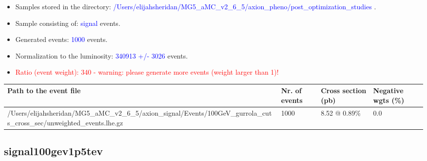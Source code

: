 \documentclass[a4paper, 10pt]{article}
\begin{document}
\begin{itemize}
  \item Samples stored in the directory: \textcolor{blue}{/\-Users/\-elijahsheridan/\-MG5\_aMC\_v2\_6\_5/\-axion\_pheno/\-post\_optimization\_studies} .
   \item Sample consisting of: \textcolor{blue}{signal}  events.
   \item Generated events: \textcolor{blue}{1000 }  events.
   \item Normalization to the luminosity: \textcolor{blue}{340913}\textcolor{blue}{ +/\-- }\textcolor{blue}{3026 }  events.
   \item\textcolor{red}{Ratio (event weight): }\textcolor{red}{340 }\textcolor{red}{ - warning: please generate more events (weight larger than 1)!}
\textcolor{red}{}
\end{itemize}
\begin{table}[H]
  \begin{center}
    \begin{tabular}{|m{55.0mm}|m{25.0mm}|m{30.0mm}|m{30.0mm}|}
      \hline
      {\cellcolor{yellow}         Path to the event file}& {\cellcolor{yellow}         Nr. of events}& {\cellcolor{yellow}         Cross section (pb)}& {\cellcolor{yellow}         Negative wgts (\%)}\\
      \hline
      {\cellcolor{white}          /\-Users/\-elijahsheridan/\-MG5\_aMC\_v2\_6\_5/\-axion\_signal/\-Events/\-100GeV\_gurrola\_cuts\_cross\_sec/\-unweighted\_events.lhe.gz}& {\cellcolor{white}          1000}& {\cellcolor{white}          8.52 @ 0.89\%}& {\cellcolor{white}          0.0}\\
\hline
    \end{tabular}
  \end{center}
\end{table}

\subsection{ signal100gev1p5tev}
\end{document}
